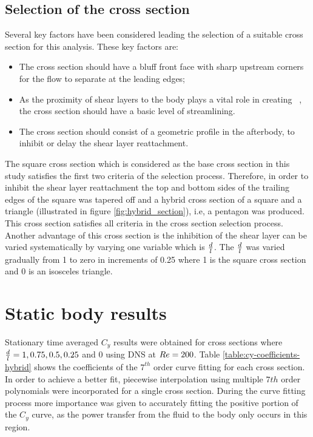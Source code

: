 \subsection*{Selection of the cross section}



Several key factors have been considered leading the selection of a suitable cross section for this analysis. These key factors are:

\begin{itemize}
\item The cross section should have a bluff front face with sharp upstream corners for the flow to separate at the leading edges;

\item As the proximity of shear layers to the body plays a vital role in creating \cy\ \citep{Parkinson1989}, the cross section should have a basic level of streamlining.

\item The cross section should consist of a geometric profile in the afterbody, to inhibit or delay the shear layer reattachment.   
\end{itemize}

The square cross section which is considered as the base cross section in this study satisfies the first two criteria of the selection process. Therefore, in order to inhibit the shear layer reattachment the top and bottom sides of the trailing edges of the square was tapered off and a hybrid cross section of a square and a triangle (illustrated in figure \ref{fig:hybrid_section}), i.e, a pentagon was produced. This cross section satisfies all criteria in the cross section selection process. Another advantage of this cross section is the inhibition of the shear layer can be varied systematically by varying one variable which is $\frac{d}{l}$. The $\frac{d}{l}$ was varied gradually from 1 to zero in increments of 0.25 where 1 is the square cross section and 0 is an isosceles triangle. 


\section{Static body results}
\label{sec:cross-sec-Static body results}



Stationary time averaged $C_y$ results were obtained for cross sections where $\frac{d}{l}=1,0.75,0.5,0.25$ and $0$ using DNS at $Re=200$. Table \ref{table:cy-coefficients-hybrid} shows the coefficients of the $7^{th}$ order curve fitting for each cross section. In order to achieve a better fit, piecewise interpolation using multiple $7th$ order polynomials were incorporated for a single cross section. During the curve fitting process more importance was given to accurately fitting the positive portion of the $C_{y}$ curve, as the power transfer from the fluid to the body only occurs in this region. 

